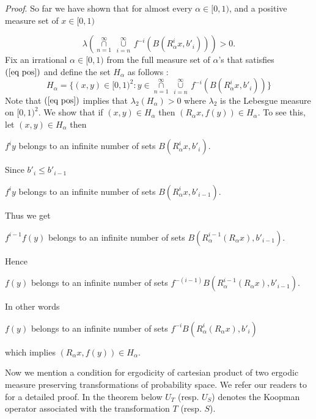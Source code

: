 \documentclass[11pt, english, reqno]{amsart}
\theoremstyle{definition}
\theoremstyle{remark}
\numberwithin{equation}{section}
\numberwithin{equation}{section}
\newcommand{\Leb}{\ensuremath{\lambda}}
\newcommand{\LS}{\ensuremath{\underset{n=1}{\overset{\infty}{\cap}} \, {\underset{i=n}{\overset{\infty}{\cup}}}\,}}
\begin{document}
\noindent\textit{Proof}. So far we have shown that for almost every $\alpha \in [0,1)$, and a positive measure set of $x \in [0,1)$

\begin{equation}\label{eq pos}
    \Leb(\LS f^{-i}(B (R_{\alpha}^{i} x,b'_i)))> 0 . 
\end{equation} Fix an irrational $\alpha \in [0,1)$ from the full measure set of $\alpha$'s that satisfies $(\ref{eq pos})$ and define the set $H_{\alpha}$ as follows : $$
H_{\alpha} = \{(x,y)\in [0,1)^2 : y \in \LS f^{-i}(B (R_{\alpha}^{i} x,b'_i))\}
$$ Note that $(\ref{eq pos})$ implies that $\lambda_2(H_{\alpha}) >0 $ where $\lambda_2$ is the Lebesgue measure on $[0,1)^2$. We show that if $(x,y) \in H_{\alpha}$ then $(R_{\alpha}x,f(y)) \in H_{\alpha}$. To see this, let $(x,y) \in H_{\alpha}$ then

\begin{center}
    $f^iy$ belongs to an infinite number of sets $B (R_{\alpha}^{i} x,b'_i)$.
\end{center} Since $b'_i \leq b'_{i-1}$

\begin{center}
    $f^iy$ belongs to an infinite number of sets $B (R_{\alpha}^{i} x,b'_{i-1})$.
\end{center} Thus we get

\begin{center}
    $f^{i-1}f(y)$ belongs to an infinite number of sets $B (R_{\alpha}^{i-1} (R_{\alpha} x),b'_{i-1})$.
\end{center} Hence

\begin{center}
    $f(y)$ belongs to an infinite number of sets $f^{-(i-1)} B (R_{\alpha}^{i-1} (R_{\alpha} x),b'_{i-1})$.
\end{center} In other words

\begin{center}
    $f(y)$ belongs to an infinite number of sets $f^{-i} B (R_{\alpha}^{i} (R_{\alpha} x),b'_{i})$
\end{center} which implies $(R_{\alpha}x,f(y)) \in H_{\alpha}$. 


Now we mention a condition for ergodicity of cartesian product of two ergodic measure preserving transformations of probability space. We refer our readers to \cite[Theorem 12]{Quas_2012} for a detailed proof. In the theorem below $U_T$ (resp. $U_S$) denotes the Koopman operator associated with the transformation $T$ (resp. $S$).

\vspace{2mm}
\end{document}
